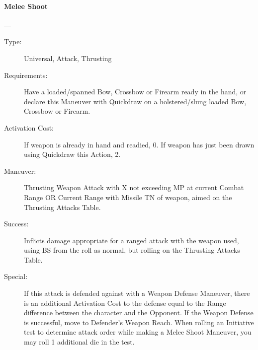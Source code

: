 \documentclass[oneside,11pt,english]{book}
\begin{document}
\paragraph{\large\label{man:Melee Shoot}Melee Shoot}---\quad{\large[X+Variable]}
\vspace{-10pt}\begin{description}
\item [Type:] Universal, Attack, Thrusting 
\item [Requirements:] Have a loaded/spanned Bow, Crossbow or Firearm ready in the hand, or declare this 
  Maneuver with Quickdraw on a holstered/slung loaded Bow, Crossbow or Firearm. 
\item [Activation Cost:] If weapon is already in hand and readied, 0. If weapon has just been drawn using 
  Quickdraw this Action, 2. 
\item [Maneuver:] Thrusting Weapon Attack with X not exceeding MP at current Combat Range OR Current 
  Range with Missile TN of weapon, aimed on the Thrusting Attacks Table. 
\item [Success:] Inflicts damage appropriate for a ranged attack with the weapon used, using BS from the roll as 
  normal, but rolling on the Thrusting Attacks Table. 
\item [Special:] If this attack is defended against with a Weapon Defense Maneuver, there is an additional 
  Activation Cost to the defense equal to the Range difference between the character and the Opponent. If 
  the Weapon Defense is successful, move to Defender’s Weapon Reach. 
  When rolling an Initiative test to determine attack order while making a Melee Shoot Maneuver, you may 
  roll 1 additional die in the test. 
\end{description}
\end{document}
